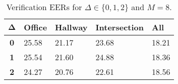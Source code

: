 \begin{table}[h]
    \centering
    \begin{tabular}{|c|M{2cm}|M{2cm}|M{2cm}|M{2cm}|}
    \hline
    $\boldsymbol{\Delta}$ & \bf{Office} & \bf{Hallway} & \bf{Intersection} & \bf{All} \\ 
    \hline 
    \hline
    \bf{0} & 25.58 & 21.17 & 23.68 & 18.21 \\
    \hline
    \bf{1} & 25.54 & 21.60 & 24.88 & 18.36 \\
    \hline
    \bf{2} & 24.27 & 20.76 & 22.61 & 18.56 \\
    \hline
    \end{tabular}
    \caption{Verification EERs for $\Delta \in \{0, 1, 2\}$ and $M = 8$.}
    \label{tab:verify_adapted_wm_M_8}
\end{table}
